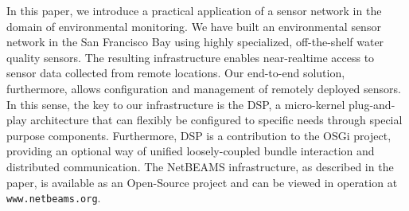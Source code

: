\documentclass[conference]{IEEEtran}
\begin{document}
In this paper, we introduce a practical application of a sensor network
in the domain of environmental monitoring. We have built an
environmental sensor network in the San Francisco Bay using highly
specialized, off-the-shelf water quality sensors. The resulting
infrastructure enables near-realtime access to sensor data collected
from remote locations. Our end-to-end solution, furthermore, allows
configuration and management of remotely deployed sensors. In this sense, the
key to our infrastructure is the DSP, a micro-kernel plug-and-play
architecture that can flexibly be configured to specific needs through
special purpose components. Furthermore, DSP is a contribution to the OSGi
project, providing an optional way of unified loosely-coupled bundle
interaction and distributed communication. The NetBEAMS infrastructure, as
described in the paper, is available as an Open-Source project and can be 
viewed in operation at \texttt{www.netbeams.org}.



\end{document}
